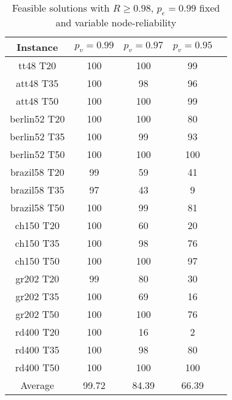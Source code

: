 \documentclass{llncs}
\begin{document}
\begin{table}
\caption{Feasible solutions with $R \geq 0.98$, $p_e=0.99$ fixed 
and variable node-reliability} %
\centering  %
\begin{tabular}{|c|c|c|c|c|} %
\hline	Instance  &	$p_v=0.99$ & 	$p_v=0.97$ & 	$p_v=0.95$\\
\hline	tt48 T20	&	100	&	100	&	99	\\
\hline	att48 T35	&	100	&	98	&	96	\\
\hline	att48 T50	&	100	&	100	&	99	\\
\hline	berlin52 T20	&	100	&	100	&	80	\\
\hline	berlin52 T35	&	100	&	99	&	93	\\
\hline	berlin52 T50	&	100	&	100	&	100	\\
\hline	brazil58 T20	&	99	&	59	&	41	\\
\hline	brazil58 T35	&	97	&	43	&	9	\\
\hline	brazil58 T50	&	100	&	99	&	81	\\
\hline	ch150 T20	&	100	&	60	&	20	\\
\hline	ch150 T35	&	100	&	98	&	76	\\
\hline	ch150 T50	&	100	&	100	&	97	\\
\hline	gr202 T20	&	99	&	80	&	30	\\
\hline	gr202 T35	&	100	&	69	&	16	\\
\hline	gr202 T50	&	100	&	100	&	76	\\
\hline	rd400 T20	&	100	&	16	&	2	\\
\hline	rd400 T35	&	100	&	98	&	80	\\
\hline	rd400 T50	&	100	&	100	&	100	\\
\hline  Average     &   99.72    &   84.39   &  66.39 \\
\hline
\end{tabular}
\label{answer2b} %
\end{table}
\end{document}
